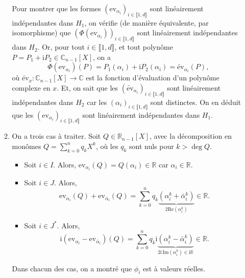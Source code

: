 \documentclass{../../td}
\begin{document}
\begin{enumerate}
\begin{enumerate}
          Pour montrer que les formes $(\mathrm{ev}_{\alpha_i})_{i \in \llbracket 1, d\rrbracket}$ sont linéairement indépendantes dans $H_1$, on vérifie (de manière équivalente, par isomorphisme) que $(\Phi(\mathrm{ev}_{\alpha_i}))_{i \in \llbracket 1,d\rrbracket}$ sont linéairement indépendantes dans $H_2$.
          Or, pour tout $i \in \llbracket 1,d\rrbracket$, et tout polynôme $P = P_1 + \mathrm{i} P_2 \in \mathds{C}_{n-1}[X]$, on a \[
            \Phi(\mathrm{ev}_{\alpha_i})(P) = P_1(\alpha_i) + \mathrm{i} P_2(\alpha_i) = \widetilde{\mathrm{ev}}_{\alpha_i}(P)
          ,\] où $\widetilde{\mathrm{ev}}_x : \mathds{C}_{n-1}[X] \to \mathds{C}$ est la fonction d'évaluation d'un polynôme complexe en $x$.
          Et, on sait que les $(\widetilde{\mathrm{ev}}_{\alpha_i})_{i \in \llbracket 1,d\rrbracket}$ sont linéairement indépendantes dans $H_2$ car les $(\alpha_i)_{i \in \llbracket 1,d\rrbracket}$ sont distinctes.
          On en déduit que les $( \mathrm{ev}_{\alpha_i})_{i \in \llbracket 1,d\rrbracket}$ sont linéairement indépendantes dans $H_1$.
        \item On a trois cas à traiter.
          Soit $Q \in \mathds{R}_{n-1}[X]$, avec la décomposition en monômes $Q = \sum_{k=0}^n q_k X^k$, où les $q_k$ sont nuls pour $k > \operatorname{deg} Q$.
          \begin{itemize}
            \item Soit $i \in I$. Alors, $\mathrm{ev}_{\alpha_i}(Q) = Q(\alpha_i) \in \mathds{R}$ car $\alpha_i \in \mathds{R}$.
            \item Soit $i \in J$.
              Alors, \[
                \mathrm{ev}_{\alpha_i}(Q) + \mathrm{ev}_{\bar{\alpha}_i}(Q) = \sum_{k=0}^n q_k \underbrace{(\alpha_i^k + \bar{\alpha}_i^k)}_{2 \mathrm{Re}(\alpha_i^k)} \in \mathds{R}
              .\]
            \item Soit $i \in J^*$.
              Alors, \[
                \mathrm{i} (\mathrm{ev}_{\alpha_i} - \mathrm{ev}_{\bar{\alpha}_i})(Q) = \sum_{k=0}^n q_k \mathrm{i} \underbrace{(\alpha_i^k - \bar{\alpha}_i^k)}_{2 \mathrm{i}\,\mathrm{Im}(\alpha_i^k) \in \mathrm{i}\mathds{R}} \in \mathds{R}
              .\] 
          \end{itemize}
          Dans chacun des cas, on a montré que $\phi_i$ est à valeurs réelles.


\end{enumerate}
\end{enumerate}
\end{document}
